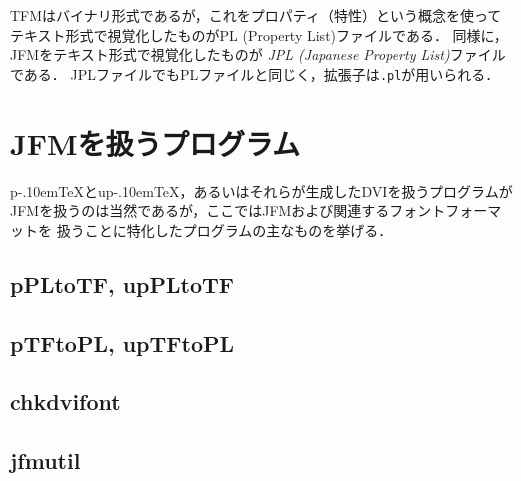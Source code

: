 \documentclass[a4paper,11pt,nomag]{jsarticle}
\def\code#1{\texttt{#1}}
\def\pTeX{p\kern-.10em\TeX}\def\upTeX{u\pTeX}
\begin{document}
TFMはバイナリ形式であるが，これをプロパティ（特性）という概念を使って
テキスト形式で視覚化したものがPL (Property List)ファイルである．
同様に，JFMをテキスト形式で視覚化したものが
\emph{JPL (Japanese Property List)}ファイルである．
JPLファイルでもPLファイルと同じく，拡張子は\code{.pl}が用いられる．


\section{JFMを扱うプログラム}

\pTeX と\upTeX ，あるいはそれらが生成したDVIを扱うプログラムが
JFMを扱うのは当然であるが，ここではJFMおよび関連するフォントフォーマットを
扱うことに特化したプログラムの主なものを挙げる．

\subsection{pPLtoTF, upPLtoTF}

\subsection{pTFtoPL, upTFtoPL}

\subsection{chkdvifont}

\subsection{jfmutil}
\end{document}
